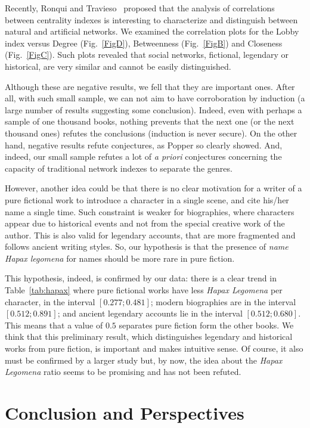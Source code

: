 \documentclass[review]{elsarticle}
\begin{document}
Recently, Ronqui and Travieso~\cite{ronqui2015analyzing} 
proposed that the analysis of correlations between 
centrality indexes is interesting to characterize 
and distinguish between natural and artificial networks.
We examined the correlation plots for the Lobby index versus 
Degree (Fig.~\ref{FigD}), Betweenness (Fig.~\ref{FigB}) 
and Closeness (Fig.~\ref{FigC}). Such plots revealed that social
networks, fictional, legendary or historical, 
are very similar and cannot be easily distinguished.

Although these are negative results, we fell that they are
important ones. After all, with such small sample, we
can not aim to have corroboration by induction (a large
number of results suggesting some conclusion).
Indeed, even with perhaps a sample of one thousand books, nothing
prevents that the next one (or the next thousand ones)
refutes the conclusions (induction is never secure).
On the other hand, negative results refute conjectures,
as Popper so clearly showed. And, indeed, our small sample
refutes a lot of \emph{a priori} conjectures concerning the
capacity of traditional network indexes to separate the genres.

However, another idea could be that there is 
no clear motivation for a writer of a pure fictional 
work to introduce a character in a single scene, 
and cite his/her name a single time.
Such constraint is weaker for biographies, where characters appear
due to historical events and not from the special creative
work of the author. This is also valid for legendary accounts, 
that are more fragmented and follows ancient writing styles. 
So, our hypothesis is that 
the presence of \emph{name Hapax legomena} for names should be 
more rare in pure fiction. 

This hypothesis, indeed, is confirmed by our data: there is a clear 
trend in Table~\ref{tab:hapax} where pure fictional works have less
\emph{Hapax Legomena} per character, 
in the interval $[0.277; 0.481]$;
modern biographies are in the interval $[0.512;0.891]$; 
and ancient legendary accounts lie in the interval $[0.512;0.680]$.
This means that a value of $0.5$ separates pure fiction form the
other books. We think that this preliminary result, 
which distinguishes legendary and historical 
works from pure fiction, is important and 
makes intuitive sense. Of course, it also must be confirmed 
by a larger study but, by now, the idea about 
the \emph{Hapax Legomena}
ratio seems to be promising and has not been refuted.

\section{Conclusion and Perspectives}
\end{document}
